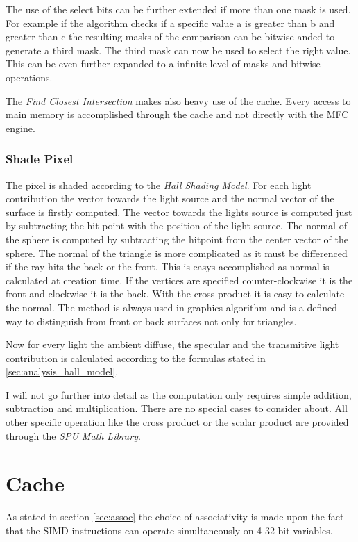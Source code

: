 \documentclass[DIV10, abstracton, openright, footsepline, headsepline, twoside, 9pt,
bigheadings]{scrreprt}
\begin{document}
The use of the select bits can be further extended if more than one mask is used.
For example if the algorithm checks if a specific value a is greater than b and
greater than c the resulting masks of the comparison can be bitwise anded to generate
a third mask. The third mask can now be used to select the right value. This can
be even further expanded to a infinite level of masks and bitwise operations.

The \textit{Find Closest Intersection} makes also heavy use of the cache. Every
access to main memory is accomplished through the cache and not directly with
the MFC engine.

\subsubsection*{Shade Pixel}
\label{sec:impl_shade_pixel}

The pixel is shaded according to the \textit{Hall Shading Model}. For each light contribution
the vector towards the light source and the normal vector of the surface is firstly
computed. The vector towards the lights source is computed just by subtracting the hit point
with the position of the light source. The normal of the sphere is computed by subtracting
the hitpoint from the center vector of the sphere. The normal of the triangle is more
complicated as it must be differenced if the ray hits the back or the front. This is
easys accomplished as normal is calculated at creation time. If the vertices are specified
counter-clockwise it is the front and clockwise it is the back. With the cross-product
it is easy to calculate the normal. The method is always used in graphics algorithm and
is a defined way to distinguish from front or back surfaces not only for triangles.


Now for every light the ambient diffuse, the specular and the transmitive light contribution
is calculated according to the formulas stated in \ref{sec:analysis_hall_model}.

I will not go further into detail as the computation only requires simple addition,
subtraction and multiplication. There are no special cases to consider about. All other
specific operation like the cross product or the scalar product are provided
through the \textit{SPU Math Library}.


\section{Cache}
As stated in section \ref{sec:assoc} the choice of associativity is made
upon the fact that the SIMD instructions  can operate simultaneously on 4 32-bit
variables.
\end{document}
